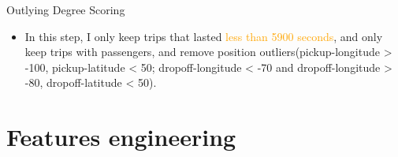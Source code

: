 \documentclass[
 size=14pt,
 paper=smartboard,  %
 mode=present, 		%
 display=slides, 	%
 style=tuliplab,  	%
 pauseslide,
 fleqn,leqno]{powerdot}
\begin{document}
\begin{slide}{Outlying Degree Scoring}

\begin{itemize}
\item
In this step, I only keep trips that
lasted  \textcolor{orange}{less than 5900 seconds}, and only keep trips with passengers, and remove position outliers(pickup-longitude > -100, pickup-latitude < 50; dropoff-longitude < -70 and dropoff-longitude > -80, dropoff-latitude < 50).

\end{itemize}

%

\end{slide}


\section{Features engineering}
\end{document}
